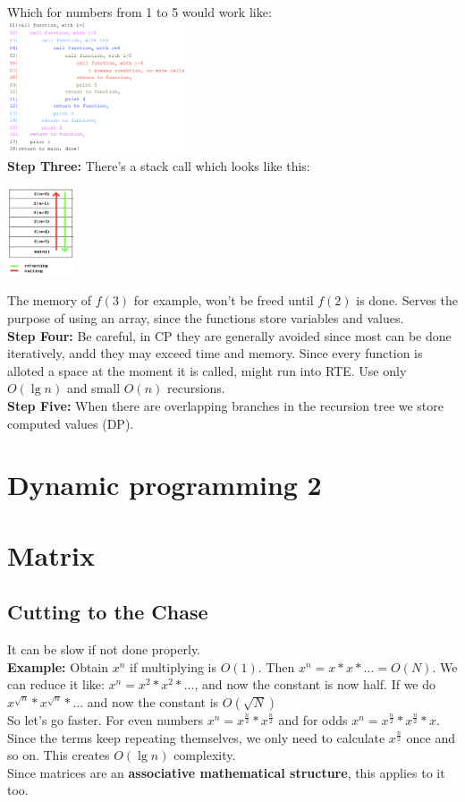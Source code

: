 \documentclass{IEEEtran}
\begin{document}
        Which for numbers from 1 to 5 would work like:\\
        \includegraphics[width=0.4\textwidth]{rofExecution.png}\\
        \textbf{Step Three:} There's a stack call which looks like this:\\
        \begin{center}
            \includegraphics[width=0.15\textwidth]{stackCalls.png}
        \end{center}
        The memory of $f(3)$ for example, won't be freed until $f(2)$ is done. Serves the purpose of using an array, since the functions store variables and values.\\
        \textbf{Step Four:} Be careful, in CP they are generally avoided since most can be done iteratively, andd they may exceed time and memory. Since every function is alloted a space at the moment it is called, might run into RTE. Use only $O(\lg{n})$ and small $O(n)$ recursions. \\
        \textbf{Step Five:} When there are overlapping branches in the recursion tree we store computed values (DP).
    \section{Dynamic programming 2}
    \section{Matrix}
        \subsection{Cutting to the Chase}
            It can be slow if not done properly.\\
            \textbf{Example:} Obtain $x^n$ if multiplying is $O(1)$. Then $x^n=x*x*\ldots = O(N)$. We can reduce it like: $x^n=x^2*x^2*...$, and now the constant is now half. If we do $x^{\sqrt{n}}*x^{\sqrt{n}}*...$ and now the constant is $O(\sqrt{N})$\\
            So let's go faster. For even numbers $x^n=x^{\frac{n}{2}}*x^{\frac{n}{2}}$ and for odds $x^n = x^{\frac{n}{2}}*x^{\frac{n}{2}}*x$.\\
            Since the terms keep repeating themselves, we only need to calculate $x^{\frac{n}{2}}$ once and so on. This creates $O(\lg{n})$ complexity.\\
            Since matrices are an \textbf{associative mathematical structure}, this applies to it too.
\end{document}
